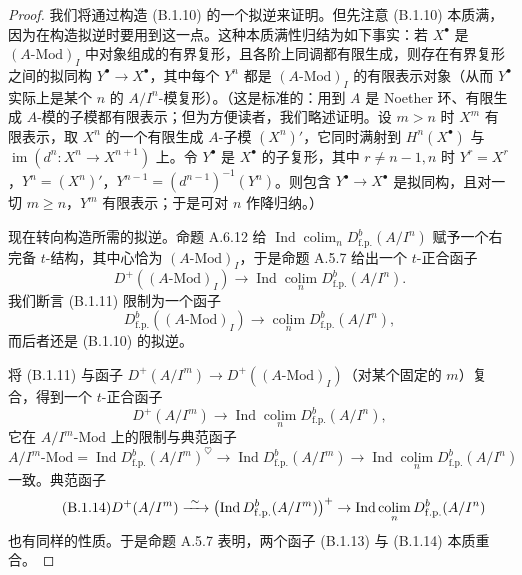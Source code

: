 \begin{proof}
我们将通过构造 (B.1.10) 的一个拟逆来证明。但先注意 (B.1.10) 本质满，因为在构造拟逆时要用到这一点。这种本质满性归结为如下事实：若 $X^\bullet$ 是 $(A\text{-}\mathrm{Mod})_I$ 中对象组成的有界复形，且各阶上同调都有限生成，则存在有界复形之间的拟同构 $Y^\bullet\to X^\bullet$，其中每个 $Y^n$ 都是 $(A\text{-}\mathrm{Mod})_I$ 的有限表示对象（从而 $Y^\bullet$ 实际上是某个 $n$ 的 $A/I^n$-模复形）。（这是标准的：用到 $A$ 是 Noether 环、有限生成 $A$-模的子模都有限表示；但为方便读者，我们略述证明。设 $m>n$ 时 $X^m$ 有限表示，取 $X^n$ 的一个有限生成 $A$-子模 $(X^n)'$，它同时满射到 $H^n(X^\bullet)$ 与 $\operatorname{im}(d^n:X^n\to X^{n+1})$ 上。令 $Y^\bullet$ 是 $X^\bullet$ 的子复形，其中 $r\ne n-1,n$ 时 $Y^r=X^r$，$Y^n=(X^n)'$，$Y^{n-1}=(d^{n-1})^{-1}(Y^n)$。则包含 $Y^\bullet\to X^\bullet$ 是拟同构，且对一切 $m\ge n$，$Y^m$ 有限表示；于是可对 $n$ 作降归纳。）

现在转向构造所需的拟逆。命题 A.6.12 给 $\operatorname{Ind}\operatorname*{colim}_n D^b_{\mathrm{f.p.}}(A/I^n)$ 赋予一个右完备 $t$-结构，其中心恰为 $(A\text{-}\mathrm{Mod})_I$，于是命题 A.5.7 给出一个 $t$-正合函子
\begin{equation}\tag{B.1.11}\label{eq:a4-18-6}
D^+((A\text{-}\mathrm{Mod})_I)\to\operatorname{Ind}\operatorname*{colim}_n D^b_{\mathrm{f.p.}}(A/I^n).
\end{equation}
我们断言 (B.1.11) 限制为一个函子
\begin{equation}\tag{B.1.12}\label{eq:a4-18-7}
D^b_{\mathrm{f.p.}}((A\text{-}\mathrm{Mod})_I)\to\operatorname*{colim}_n D^b_{\mathrm{f.p.}}(A/I^n),
\end{equation}
而后者还是 (B.1.10) 的拟逆。

将 (B.1.11) 与函子 $D^+(A/I^m)\to D^+((A\text{-}\mathrm{Mod})_I)$（对某个固定的 $m$）复合，得到一个 $t$-正合函子
\begin{equation}\tag{B.1.13}\label{eq:a4-18-8}
D^+(A/I^m)\to\operatorname{Ind}\operatorname*{colim}_n D^b_{\mathrm{f.p.}}(A/I^n),
\end{equation}
它在 $A/I^m$-$\mathrm{Mod}$ 上的限制与典范函子
\[
A/I^m\text{-}\mathrm{Mod}=\operatorname{Ind}D^b_{\mathrm{f.p.}}(A/I^m)^{\heartsuit}\to\operatorname{Ind}D^b_{\mathrm{f.p.}}(A/I^m)\to\operatorname{Ind}\operatorname*{colim}_n D^b_{\mathrm{f.p.}}(A/I^n)
\]
一致。典范函子
\begin{equation}\tag{B.1.14}\label{eq:a4-18-9}
D^+(A/I^m)\xrightarrow{\ \sim\ }\bigl(\operatorname{Ind}D^b_{\mathrm{f.p.}}(A/I^m)\bigr)^+\to\operatorname{Ind}\operatorname*{colim}_n D^b_{\mathrm{f.p.}}(A/I^n)
\end{equation}
也有同样的性质。于是命题 A.5.7 表明，两个函子 (B.1.13) 与 (B.1.14) 本质重合。


\end{proof}
